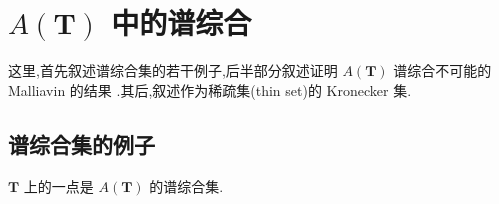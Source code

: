 \section{\texorpdfstring{$A(\mathbf{T})$ 中的谱综合}{A(T) 中的谱综合}}\label{sec:3.3}


这里,首先叙述谱综合集的若干例子,后半部分叙述证明 $A(\mathbf{T})$ 谱综合不可能的 Malliavin 的结果 \cite{ch3:34}.其后,叙述作为稀疏集(thin set)的 Kronecker 集.

\subsection{谱综合集的例子}\label{sec:3.3.1}

\begin{theorem}\label{thm:3.3.1}
$\mathbf{T}$ 上的一点是 $A(\mathbf{T})$ 的谱综合集.
\end{theorem}

